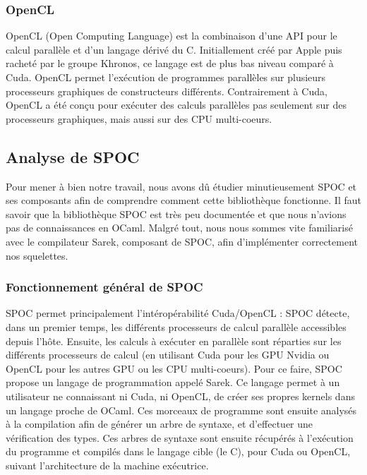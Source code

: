 \documentclass{report}
\begin{document}
\begin{itemize}
\subsubsection{OpenCL}
OpenCL (Open Computing Language) est la combinaison d'une API pour le calcul parallèle et d'un langage dérivé du C. Initiallement créé par Apple puis racheté par le groupe Khronos, ce langage est de plus bas niveau comparé à Cuda. \newline
OpenCL permet l'exécution de programmes parallèles sur plusieurs processeurs graphiques de constructeurs différents. \newline
Contrairement à Cuda, OpenCL a été conçu pour exécuter des calculs parallèles pas seulement sur des processeurs graphiques, mais aussi sur des CPU multi-coeurs. \newline

\subsection{Analyse de SPOC}
Pour mener à bien notre travail, nous avons dû étudier minutieusement SPOC et ses composants afin de comprendre comment cette bibliothèque fonctionne. Il faut savoir que la bibliothèque SPOC est très peu documentée et que nous n'avions pas de connaissances en OCaml.\newline
Malgré tout, nous nous sommes vite familiarisé avec le compilateur Sarek, composant de SPOC, afin d'implémenter correctement nos squelettes. \newline

\subsubsection{Fonctionnement général de SPOC}
SPOC permet principalement l'intéropérabilité Cuda/OpenCL :\newline
SPOC détecte, dans un premier temps, les différents processeurs de calcul parallèle accessibles depuis l'hôte.\newline
Ensuite, les calculs à exécuter en parallèle sont réparties sur les différents processeurs de calcul (en utilisant Cuda pour les GPU Nvidia ou OpenCL pour les autres GPU ou les CPU multi-coeurs). \newline
Pour ce faire, SPOC propose un langage de programmation appelé Sarek. Ce langage permet à un utilisateur ne connaissant ni Cuda, ni OpenCL, de créer ses propres kernels dans un langage proche de OCaml. Ces morceaux de programme sont ensuite analysés à la compilation afin de générer un arbre de syntaxe, et d'effectuer une vérification des types.\newline
Ces arbres de syntaxe sont ensuite récupérés à l'exécution du programme et compilés dans le langage cible (le C), pour Cuda ou OpenCL, suivant l'architecture de la machine exécutrice. \newline


\end{itemize}
\end{document}

